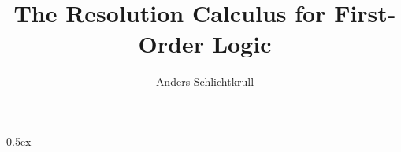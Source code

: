 \documentclass[10pt,a4paper]{article}
\begin{document}
\title{The Resolution Calculus for First-Order Logic}
\author{Anders Schlichtkrull}

\maketitle

\tableofcontents

\parindent 0pt
\parskip 0.5ex





\end{document}
